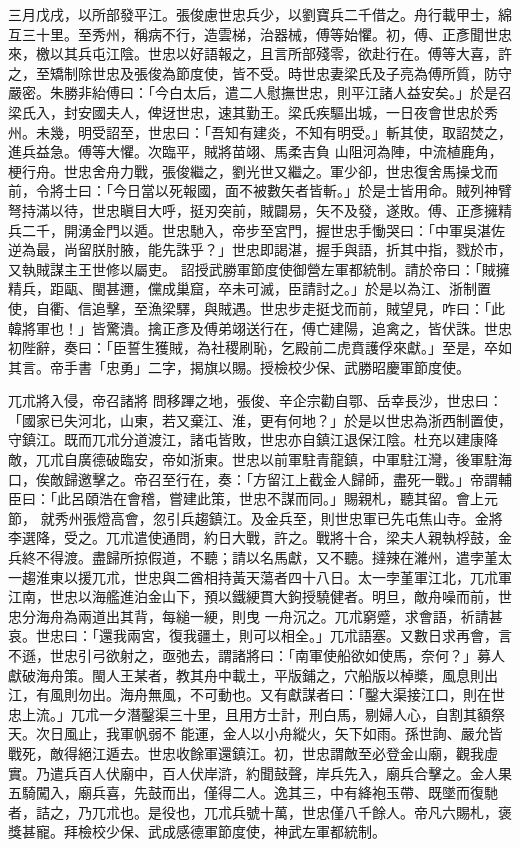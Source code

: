 \begin{pinyinscope}
 三月戊戌，以所部發平江。張俊慮世忠兵少，以劉寶兵二千借之。舟行載甲士，綿互三十里。至秀州，稱病不行，造雲梯，治器械，傅等始懼。初，傅、正彥聞世忠
 來，檄以其兵屯江陰。世忠以好語報之，且言所部殘零，欲赴行在。傅等大喜，許之，至矯制除世忠及張俊為節度使，皆不受。時世忠妻梁氏及子亮為傅所質，防守嚴密。朱勝非紿傅曰：「今白太后，遣二人慰撫世忠，則平江諸人益安矣。」於是召梁氏入，封安國夫人，俾迓世忠，速其勤王。梁氏疾驅出城，一日夜會世忠於秀州。未幾，明受詔至，世忠曰：「吾知有建炎，不知有明受。」斬其使，取詔焚之，進兵益急。傅等大懼。次臨平，賊將苗翊、馬柔吉負
 山阻河為陣，中流植鹿角，梗行舟。世忠舍舟力戰，張俊繼之，劉光世又繼之。軍少卻，世忠復舍馬操戈而前，令將士曰：「今日當以死報國，面不被數矢者皆斬。」於是士皆用命。賊列神臂弩持滿以待，世忠瞋目大呼，挺刃突前，賊闢易，矢不及發，遂敗。傅、正彥擁精兵二千，開湧金門以遁。世忠馳入，帝步至宮門，握世忠手慟哭曰：「中軍吳湛佐逆為最，尚留朕肘腋，能先誅乎？」世忠即謁湛，握手與語，折其中指，戮於市，又執賊謀主王世修以屬吏。
 詔授武勝軍節度使御營左軍都統制。請於帝曰：「賊擁精兵，距甌、閩甚邇，儻成巢窟，卒未可滅，臣請討之。」於是以為江、浙制置使，自衢、信追擊，至漁梁驛，與賊遇。世忠步走挺戈而前，賊望見，咋曰：「此韓將軍也！」皆驚潰。擒正彥及傅弟翊送行在，傅亡建陽，追禽之，皆伏誅。世忠初陛辭，奏曰：「臣誓生獲賊，為社稷刷恥，乞殿前二虎賁護俘來獻。」至是，卒如其言。帝手書「忠勇」二字，揭旗以賜。授檢校少保、武勝昭慶軍節度使。



 兀朮將入侵，帝召諸將
 問移蹕之地，張俊、辛企宗勸自鄂、岳幸長沙，世忠曰：「國家已失河北，山東，若又棄江、淮，更有何地？」於是以世忠為浙西制置使，守鎮江。既而兀朮分道渡江，諸屯皆敗，世忠亦自鎮江退保江陰。杜充以建康降敵，兀朮自廣德破臨安，帝如浙東。世忠以前軍駐青龍鎮，中軍駐江灣，後軍駐海口，俟敵歸邀擊之。帝召至行在，奏：「方留江上截金人歸師，盡死一戰。」帝謂輔臣曰：「此呂頤浩在會稽，嘗建此策，世忠不謀而同。」賜親札，聽其留。會上元節，
 就秀州張燈高會，忽引兵趨鎮江。及金兵至，則世忠軍已先屯焦山寺。金將李選降，受之。兀朮遣使通問，約日大戰，許之。戰將十合，梁夫人親執桴鼓，金兵終不得渡。盡歸所掠假道，不聽；請以名馬獻，又不聽。撻辣在濰州，遣孛堇太一趨淮東以援兀朮，世忠與二酋相持黃天蕩者四十八日。太一孛堇軍江北，兀朮軍江南，世忠以海艦進泊金山下，預以鐵綆貫大鉤授驍健者。明旦，敵舟噪而前，世忠分海舟為兩道出其背，每縋一綆，則曳
 一舟沉之。兀朮窮蹙，求會語，祈請甚哀。世忠曰：「還我兩宮，復我疆土，則可以相全。」兀朮語塞。又數日求再會，言不遜，世忠引弓欲射之，亟弛去，謂諸將曰：「南軍使船欲如使馬，奈何？」募人獻破海舟策。閩人王某者，教其舟中載土，平版鋪之，穴船版以棹槳，風息則出江，有風則勿出。海舟無風，不可動也。又有獻謀者曰：「鑿大渠接江口，則在世忠上流。」兀朮一夕潛鑿渠三十里，且用方士計，刑白馬，剔婦人心，自割其額祭天。次日風止，我軍帆弱不
 能運，金人以小舟縱火，矢下如雨。孫世詢、嚴允皆戰死，敵得絕江遁去。世忠收餘軍還鎮江。初，世忠謂敵至必登金山廟，觀我虛實。乃遣兵百人伏廟中，百人伏岸滸，約聞鼓聲，岸兵先入，廟兵合擊之。金人果五騎闖入，廟兵喜，先鼓而出，僅得二人。逸其三，中有絳袍玉帶、既墜而復馳者，詰之，乃兀朮也。是役也，兀朮兵號十萬，世忠僅八千餘人。帝凡六賜札，褒獎甚寵。拜檢校少保、武成感德軍節度使，神武左軍都統制。




\end{pinyinscope}
